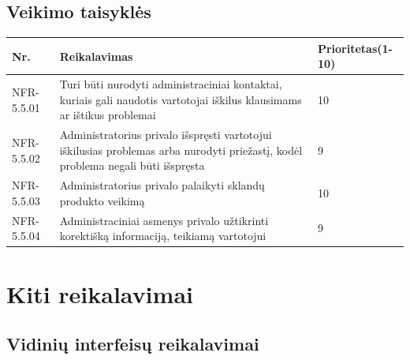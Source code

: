 \documentclass[oneside]{VUMIFPSkursinis}
\begin{document}
\subsection{Veikimo taisyklės}
\begin{table}[htbp]
	\begin{tabularx}{1\textwidth}{ |P{2.5cm}|X|P{3cm }| }  \hline
		Nr. & Reikalavimas & Prioritetas(1-10) \\ \hline
		NFR-5.5.01 & Turi būti nurodyti administraciniai kontaktai, kuriais gali naudotis vartotojai iškilus klausimams ar ištikus problemai & 10 \\ \hline
		NFR-5.5.02 & Administratorius privalo išspręsti vartotojui iškilusias problemas arba nurodyti priežastį, kodėl problema negali būti išspręsta  & 9 \\ \hline
		NFR-5.5.03 & Administratorius privalo palaikyti sklandų produkto veikimą & 10 \\ \hline
		NFR-5.5.04 & Administraciniai asmenys privalo užtikrinti korektišką informaciją, teikiamą vartotojui & 9 \\ \hline
	\end{tabularx}
\end{table}
\pagebreak
\section{Kiti reikalavimai}

\subsection{Vidinių interfeisų reikalavimai}
\end{document}
